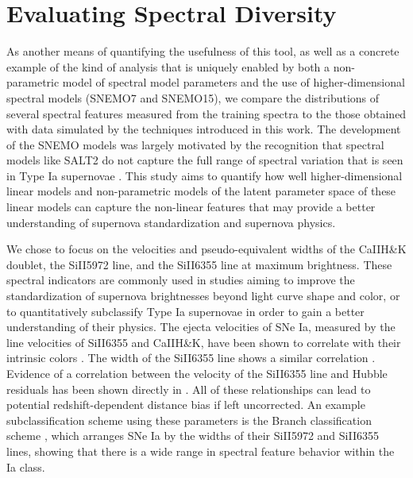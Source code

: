 \section{Evaluating Spectral Diversity}
\label{sec:spec_diversity}
As another means of quantifying the usefulness of this tool, as well as a concrete example of the kind of analysis that is uniquely enabled by both a non-parametric model of spectral model parameters and the use of higher-dimensional spectral models (SNEMO7 and SNEMO15), we compare the distributions of several spectral features measured from the training spectra to the those obtained with data simulated by the techniques introduced in this work. The development of the SNEMO models was largely motivated by the recognition that spectral models like SALT2 do not capture the full range of spectral variation that is seen in Type Ia supernovae \parencite{Saunders2018}. This study aims to quantify how well higher-dimensional linear models and non-parametric models of the latent parameter space of these linear models can capture the non-linear features that may provide a better understanding of supernova standardization and supernova physics.

We chose to focus on the velocities and pseudo-equivalent widths of the CaIIH\&K doublet, the SiII5972 line, and the SiII6355 line at maximum brightness. These spectral indicators are commonly used in studies aiming to improve the standardization of supernova brightnesses beyond light curve shape and color, or to quantitatively subclassify Type Ia supernovae in order to gain a better understanding of their physics. The ejecta velocities of SNe Ia, measured by the line velocities of SiII6355 and CaIIH\&K, have been shown to correlate with their intrinsic colors \parencite{FoleyKasen2011, FSK2011, Foley2012, Mandel2014}. The width of the SiII6355 line shows a similar correlation \parencite{FSK2011}. Evidence of a correlation between the velocity of the SiII6355 line and Hubble residuals has been shown directly in \cite{Siebert2020}. All of these relationships can lead to potential redshift-dependent distance bias if left uncorrected. An example subclassification scheme using these parameters is the Branch classification scheme \parencite{Branch2006}, which arranges SNe Ia by the widths of their SiII5972 and SiII6355 lines, showing that there is a wide range in spectral feature behavior within the Ia class. 

